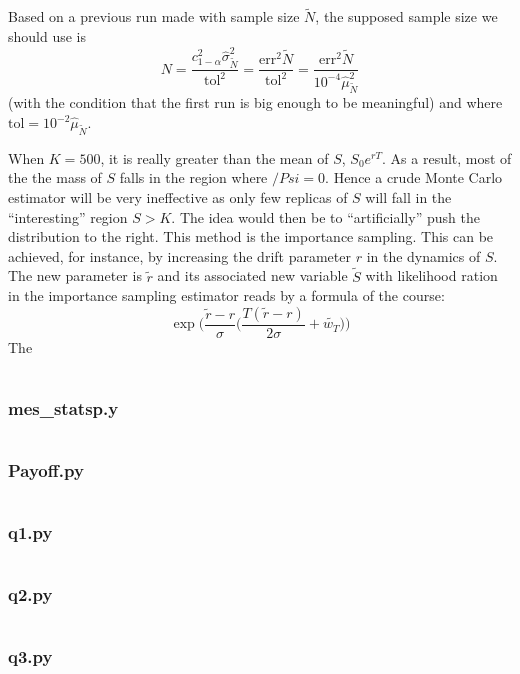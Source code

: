 \documentclass[a4paper]{article}
\theoremstyle{definition}
\theoremstyle{remark}
\newcommand{\python}[1]{\inputminted[linenos,frame=single]{python}{#1}}
\begin{document}
\part{}
Based on a previous run made with sample size $\tilde{N}$, the supposed sample size we should use is
$$N=\frac{c_{1-\alpha}^2\hat{\sigma}^2_{\tilde{N}}}{\text{tol}^2} = \frac{\text{err}^2\tilde{N}}{\text{tol}^2}
= \frac{\text{err}^2\tilde{N}}{10^{-4}\hat{\mu}_{\tilde{N}}^2}$$ 
(with the condition that the first run is big enough to be meaningful) and where $\text{tol}=10^{-2}\hat{\mu}_{\tilde{N}}$.

When $K=500$, it is really greater than the mean of $S$, $S_0e^{rT}$. As a result, most of the the mass of $S$ falls in the region where $/Psi=0$. Hence a crude Monte Carlo estimator will be very ineffective as only few replicas of $S$ will fall in the “interesting” region $S > K$. The idea would then be to “artificially” push the distribution to the right. This method is the importance sampling. This can be achieved, for instance, by increasing the drift parameter $r$ in the dynamics of $S$. The new parameter is $\tilde{r}$ and its associated new variable $\tilde{S}$ with likelihood ration in the importance sampling estimator reads by a formula of the course: 
$$\exp\Big(\frac{\tilde{r}-r}{\sigma}\big(\frac{T(\tilde{r}-r)}{2\sigma}+\tilde{w_T}\big)\Big)$$
The 

\part{}

\appendix
\section{mes\_statsp.y}
\python{mes_stats.py}
\section{Payoff.py}
\python{Payoff.py}
\section{q1.py}
\python{q1.py}
\section{q2.py}
\python{q2.py}
\section{q3.py}
\end{document}
